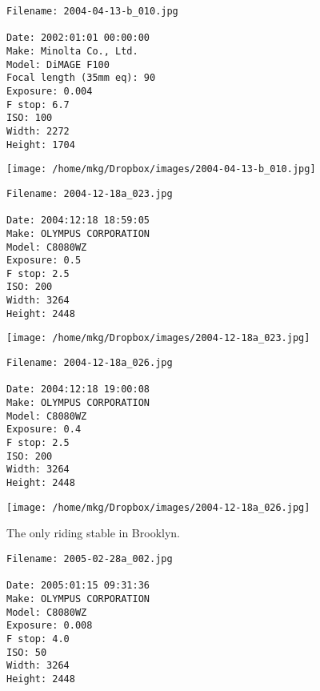 \noindent 
\begin{lstlisting}
Filename: 2004-04-13-b_010.jpg

Date: 2002:01:01 00:00:00
Make: Minolta Co., Ltd.
Model: DiMAGE F100
Focal length (35mm eq): 90
Exposure: 0.004
F stop: 6.7
ISO: 100
Width: 2272
Height: 1704
\end{lstlisting}

\begin{landscape}

\texttt{[image: /home/mkg/Dropbox/images/2004-04-13-b\_010.jpg]}
\end{landscape}



\noindent 
\begin{lstlisting}
Filename: 2004-12-18a_023.jpg

Date: 2004:12:18 18:59:05
Make: OLYMPUS CORPORATION
Model: C8080WZ
Exposure: 0.5
F stop: 2.5
ISO: 200
Width: 3264
Height: 2448
\end{lstlisting}

\begin{landscape}

\texttt{[image: /home/mkg/Dropbox/images/2004-12-18a\_023.jpg]}
\end{landscape}



\noindent 
\begin{lstlisting}
Filename: 2004-12-18a_026.jpg

Date: 2004:12:18 19:00:08
Make: OLYMPUS CORPORATION
Model: C8080WZ
Exposure: 0.4
F stop: 2.5
ISO: 200
Width: 3264
Height: 2448
\end{lstlisting}

\begin{landscape}

\texttt{[image: /home/mkg/Dropbox/images/2004-12-18a\_026.jpg]}
\end{landscape}



\noindent The only riding stable in Brooklyn.
\begin{lstlisting}
Filename: 2005-02-28a_002.jpg

Date: 2005:01:15 09:31:36
Make: OLYMPUS CORPORATION
Model: C8080WZ
Exposure: 0.008
F stop: 4.0
ISO: 50
Width: 3264
Height: 2448
\end{lstlisting}

